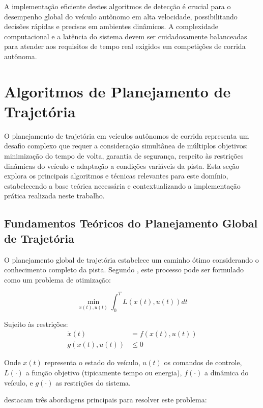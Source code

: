 A implementação eficiente destes algoritmos de detecção é crucial para o
desempenho global do veículo autônomo em alta velocidade, possibilitando
decisões rápidas e precisas em ambientes dinâmicos. A complexidade
computacional e a latência do sistema devem ser cuidadosamente balanceadas para
atender aos requisitos de tempo real exigidos em competições de corrida
autônoma.

\section{Algoritmos de Planejamento de Trajetória}

O planejamento de trajetória em veículos autônomos de corrida representa um
desafio complexo que requer a consideração simultânea de múltiplos objetivos:
minimização do tempo de volta, garantia de segurança, respeito às restrições
dinâmicas do veículo e adaptação a condições variáveis da pista. Esta seção
explora os principais algoritmos e técnicas relevantes para este domínio,
estabelecendo a base teórica necessária e contextualizando a implementação
prática realizada neste trabalho.

\subsection{Fundamentos Teóricos do Planejamento Global de Trajetória}

O planejamento global de trajetória estabelece um caminho ótimo considerando o
conhecimento completo da pista. Segundo \cite{Karaman2011Optimal}, este
processo pode ser formulado como um problema de otimização:

\begin{equation}
    \min_{x(t), u(t)} \int_0^T L(x(t), u(t))dt
    \label{eq:trajectory_optimization}
\end{equation}

Sujeito às restrições:
\begin{align}
    \dot{x}(t)    & = f(x(t), u(t)) \label{eq:trajectory_constraint_dynamics} \\
    g(x(t), u(t)) & \leq 0 \label{eq:trajectory_constraint_limits}
\end{align}

Onde $x(t)$ representa o estado do veículo, $u(t)$ os comandos de controle,
$L(\cdot)$ a função objetivo (tipicamente tempo ou energia), $f(\cdot)$ a
dinâmica do veículo, e $g(\cdot)$ as restrições do sistema.

\cite{Wang2020LMPC} destacam três abordagens principais para resolver este problema:

